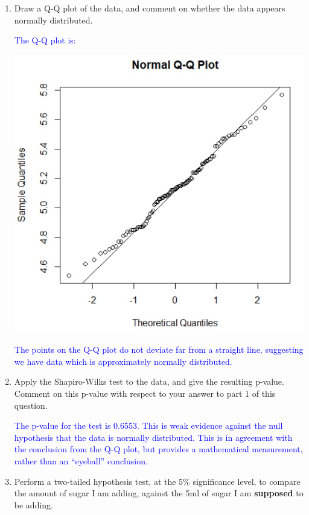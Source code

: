 \documentclass[11pt,a4paper]{article}
\begin{document}
\begin{enumerate}
\item Draw a Q-Q plot of the data, and comment on whether the data appears normally distributed.

\newpage

\textcolor{blue}{The Q-Q plot is:}

\includegraphics[scale=0.7]{ISDSA2pic1.jpg}

\textcolor{blue}{The points on the Q-Q plot do not deviate far from a straight line, suggesting we have data which is approximately normally distributed.}



\item Apply the Shapiro-Wilks test to the data, and give the resulting p-value. Comment on this p-value with respect to your answer to part 1 of this question.

\textcolor{blue}{The p-value for the test is 0.6553. This is weak evidence against the null hypothesis that the data is normally distributed. This is in agreement with the conclusion from the Q-Q plot, but provides a mathematical measurement, rather than an ``eyeball'' conclusion.}


\item Perform a two-tailed hypothesis test, at the 5\% significance level, to compare the amount of sugar I am adding, against the 5ml of sugar I am \textbf{supposed} to be adding.


\end{enumerate}
\end{document}
